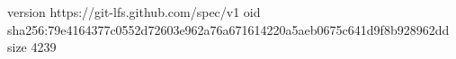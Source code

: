 version https://git-lfs.github.com/spec/v1
oid sha256:79e4164377c0552d72603e962a76a671614220a5aeb0675c641d9f8b928962dd
size 4239
